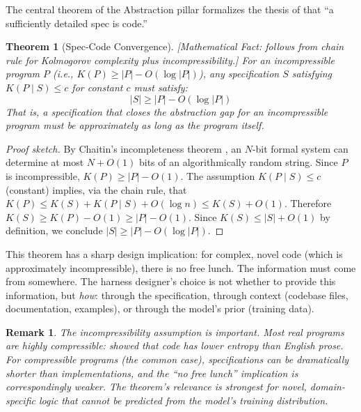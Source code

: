 \documentclass[11pt, a4paper, logo, copyright]{googledeepmind}
\newtheorem{theorem}{Theorem}[section]
\newtheorem*{remark}{Remark}
\begin{document}
The central theorem of the Abstraction pillar formalizes the thesis of \citet{gonzalez2026spec} that ``a sufficiently detailed spec is code.''

\begin{theorem}[Spec-Code Convergence]
\emph{[Mathematical Fact: follows from chain rule for Kolmogorov complexity plus incompressibility.]}
\label{thm:convergence}
For an incompressible program $P$ (i.e., $K(P) \geq |P| - O(\log |P|)$), any specification $S$ satisfying $K(P \mid S) \leq c$ for constant $c$ must satisfy:
\begin{equation}
    |S| \geq |P| - O(\log |P|)
\end{equation}
That is, a specification that closes the abstraction gap for an incompressible program must be approximately as long as the program itself.
\end{theorem}

\begin{proof}[Proof sketch]
By Chaitin's incompleteness theorem \citep{chaitin1966length}, an $N$-bit formal system can determine at most $N + O(1)$ bits of an algorithmically random string. Since $P$ is incompressible, $K(P) \geq |P| - O(1)$. The assumption $K(P \mid S) \leq c$ (constant) implies, via the chain rule, that $K(P) \leq K(S) + K(P \mid S) + O(\log n) \leq K(S) + O(1)$. Therefore $K(S) \geq K(P) - O(1) \geq |P| - O(1)$. Since $K(S) \leq |S| + O(1)$ by definition, we conclude $|S| \geq |P| - O(\log |P|)$.
\end{proof}

This theorem has a sharp design implication: for complex, novel code (which is approximately incompressible), there is no free lunch. The information must come from somewhere. The harness designer's choice is not whether to provide this information, but \emph{how}: through the specification, through context (codebase files, documentation, examples), or through the model's prior (training data).

\begin{remark}
The incompressibility assumption is important. Most real programs are highly compressible: \citet{hindle2012naturalness} showed that code has lower entropy than English prose. For compressible programs (the common case), specifications can be dramatically shorter than implementations, and the ``no free lunch'' implication is correspondingly weaker. The theorem's relevance is strongest for novel, domain-specific logic that cannot be predicted from the model's training distribution.
\end{remark}
\end{document}
